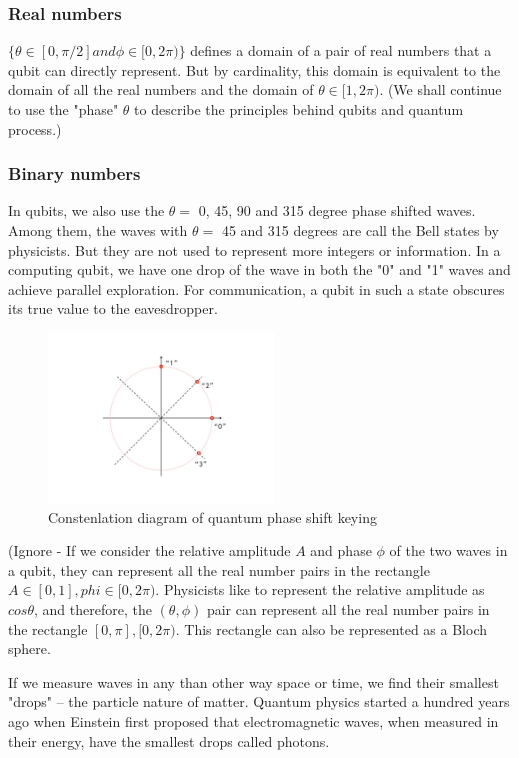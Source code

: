 \documentclass{book}
\begin{document}
\subsubsection{Real numbers}
 $\{\theta \in [0, \pi /2] and \phi \in [0, 2\pi)\}$ defines a domain of a pair of real numbers that a qubit can directly represent. But by cardinality, this domain is equivalent to the domain of all the real numbers and the domain of ${\theta \in [1, 2\pi)}$. (We shall continue to use the "phase" $\theta$ to describe the principles behind qubits and quantum process.)
 
 \subsubsection{Binary numbers}
In qubits, we also use the $\theta =$ 0, 45, 90 and 315 degree phase shifted waves. Among them, the waves with $\theta =$ 45 and 315 degrees are call the Bell states by physicists. But they are not used to represent more integers or information. In a computing qubit, we have one drop of the wave in both the "0" and "1" waves and achieve parallel exploration. For communication, a qubit in such a state obscures its true value to the eavesdropper. 
\begin{figure}[htbp]
\includegraphics[width=6cm]{pic/qqpsk.jpg}
%
\caption{Constenlation diagram of quantum phase shift keying}
\label{qQPSK}
\end{figure}

(Ignore - If we consider the relative amplitude $A$ and phase $\phi$ of the two waves in a qubit, they can represent all the real number pairs in the rectangle ${ A \in [0,1], phi \in [0,2\pi) }$. Physicists like to represent the relative amplitude as $cos\theta$, and therefore, the $(\theta, \phi)$ pair can represent all the real number pairs in the rectangle ${[0,\pi],  [0,2\pi)}$. This rectangle can also be represented as a Bloch sphere.

If we measure waves in any than other way space or time, we find their smallest "drops" -- the particle nature of matter. Quantum physics started a hundred years ago when Einstein first proposed that electromagnetic waves, when measured in their energy, have the smallest drops called photons.
\end{document}
